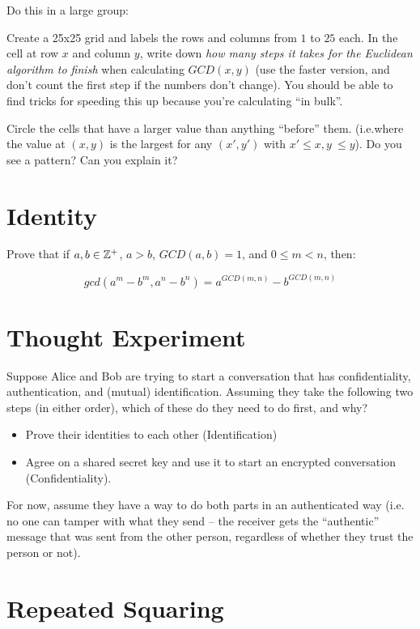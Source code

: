 \documentclass[12pt]{article}
\begin{document}
Do this in a large group:

Create a 25x25 grid and labels the rows and columns from $1$ to $25$ each. In the cell at row $x$ and column $y$, write down \emph{how many steps it takes for the Euclidean algorithm to finish} when calculating $GCD(x, y)$ (use the faster version, and don't count the first step if the numbers don't change). You should be able to find tricks for speeding this up because you're calculating ``in bulk''.

Circle the cells that have a larger value than anything ``before'' them. (i.e.where the value at $(x,y)$ is the largest for any $(x', y')$ with $x' \leq x, y\ \leq y$). Do you see a pattern? Can you explain it?


\section{Identity}


Prove that if $a, b \in \mathbb{Z}^+$, $a > b$, $GCD(a, b) = 1$, and $0 \leq m < n$, then:

$$
gcd(a^m - b^m, a^n - b^n) = a^{GCD(m, n)} - b^{GCD(m, n)}
$$


\section{Thought Experiment}

Suppose Alice and Bob are trying to start a conversation that has confidentiality, authentication, and (mutual) identification. Assuming they take the following two steps (in either order), which of these do they need to do first, and why?

\begin{itemize}
\item Prove their identities to each other (Identification)
\item Agree on a shared secret key and use it to start an encrypted conversation (Confidentiality).
\end{itemize}

For now, assume they have a way to do both parts in an authenticated way (i.e. no one can tamper with what they send -- the receiver gets the ``authentic'' message that was sent from the other person, regardless of whether they trust the person or not).

\section{Repeated Squaring}
\end{document}
